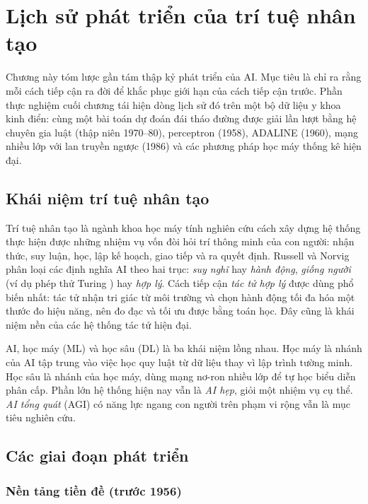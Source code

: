 
\renewcommand{\thetable}{\thechapter.\arabic{table}}\renewcommand{\thefigure}{\thechapter.\arabic{figure}}
\chapter{Lịch sử phát triển của trí tuệ nhân tạo}
\label{chap:history}

Chương này tóm lược gần tám thập kỷ phát triển của AI. Mục tiêu là chỉ ra rằng mỗi cách tiếp cận ra đời để khắc phục giới hạn của cách tiếp cận trước. Phần thực nghiệm cuối chương tái hiện dòng lịch sử đó trên một bộ dữ liệu y khoa kinh điển: cùng một bài toán dự đoán đái tháo đường được giải lần lượt bằng hệ chuyên gia luật (thập niên 1970–80), perceptron (1958), ADALINE (1960), mạng nhiều lớp với lan truyền ngược (1986) và các phương pháp học máy thống kê hiện đại.

\section{Khái niệm trí tuệ nhân tạo}

Trí tuệ nhân tạo là ngành khoa học máy tính nghiên cứu cách xây dựng hệ thống thực hiện được những nhiệm vụ vốn đòi hỏi trí thông minh của con người: nhận thức, suy luận, học, lập kế hoạch, giao tiếp và ra quyết định. Russell và Norvig \cite{russell2021} phân loại các định nghĩa AI theo hai trục: \emph{suy nghĩ} hay \emph{hành động}, \emph{giống người} (ví dụ phép thử Turing \cite{turing1950}) hay \emph{hợp lý}. Cách tiếp cận \emph{tác tử hợp lý} được dùng phổ biến nhất: tác tử nhận tri giác từ môi trường và chọn hành động tối đa hóa một thước đo hiệu năng, nên đo đạc và tối ưu được bằng toán học. Đây cũng là khái niệm nền của các hệ thống tác tử hiện đại.

AI, học máy (ML) và học sâu (DL) là ba khái niệm lồng nhau. Học máy là nhánh của AI tập trung vào việc học quy luật từ dữ liệu thay vì lập trình tường minh. Học sâu là nhánh của học máy, dùng mạng nơ-ron nhiều lớp để tự học biểu diễn phân cấp. Phần lớn hệ thống hiện nay vẫn là \emph{AI hẹp}, giỏi một nhiệm vụ cụ thể. \emph{AI tổng quát} (AGI) có năng lực ngang con người trên phạm vi rộng vẫn là mục tiêu nghiên cứu.

\section{Các giai đoạn phát triển}

\subsection{Nền tảng tiền đề (trước 1956)}


